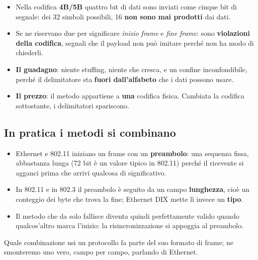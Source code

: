 \begin{itemize}
    \item Nella codifica \textbf{4B/5B} quattro bit di dati sono inviati come cinque bit di segnale: dei 32 simboli possibili, 16
          \textbf{non sono mai prodotti} dai dati.
    \item Se ne riservano due per significare \emph{inizio frame} e \emph{fine frame}: sono \textbf{violazioni della codifica},
          segnali che il payload non può imitare perché non ha modo di chiederli.
    \item \textbf{Il guadagno}: niente stuffing, niente che cresca, e un confine inconfondibile, perché il delimitatore sta
          \textbf{fuori dall'alfabeto} che i dati possono usare.
    \item \textbf{Il prezzo}: il metodo appartiene a \textbf{una} codifica fisica. Cambiata la codifica sottostante, i delimitatori
          spariscono.
\end{itemize}

\subsection{In pratica i metodi si combinano}

\begin{itemize}
    \item Ethernet e 802.11 iniziano un frame con un \textbf{preambolo}: una sequenza fissa, abbastanza lunga (72 bit è un valore tipico
          in 802.11) perché il ricevente si agganci prima che arrivi qualcosa di significativo.
    \item In 802.11 e in 802.3 il preambolo è seguito da un campo \textbf{lunghezza}, cioè un conteggio dei byte che trova la fine;
          Ethernet DIX mette lì invece un \textbf{tipo}.
    \item Il metodo che da solo fallisce diventa quindi perfettamente valido quando qualcos'altro marca l'inizio: la
          risincronizzazione si appoggia al preambolo.
\end{itemize}

Quale combinazione usi un protocollo fa parte del suo formato di frame; ne smonteremo uno vero, campo per campo, parlando di
Ethernet.

